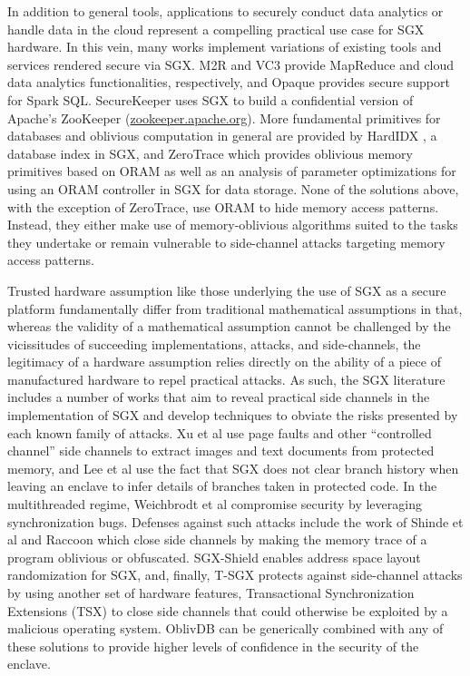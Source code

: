 \documentclass[conference]{IEEEtran}
\def\name/{OblivDB}
\begin{document}
In addition to general tools, applications to securely conduct data analytics or handle data in the cloud represent a compelling practical use case for SGX hardware. In this vein, many works implement variations of existing tools and services rendered secure via SGX. M2R \cite{DSC+15} and VC3 \cite{SCF+15} provide MapReduce and cloud data analytics functionalities, respectively, and Opaque \cite{ZDB+17} provides secure support for Spark SQL. SecureKeeper \cite{BWG+16} uses SGX to build a confidential version of Apache's ZooKeeper (\url{zookeeper.apache.org}). More fundamental primitives for databases and oblivious computation in general are provided by HardIDX \cite{FBB+17}, a database index in SGX, and ZeroTrace \cite{SGF17} which provides oblivious memory primitives based on ORAM as well as an analysis of parameter optimizations for using an ORAM controller in SGX for data storage. None of the solutions above, with the exception of ZeroTrace, use ORAM to hide memory access patterns. Instead, they either make use of memory-oblivious algorithms suited to the tasks they undertake or remain vulnerable to side-channel attacks targeting memory access patterns. 

Trusted hardware assumption like those underlying the use of SGX as a secure platform fundamentally differ from traditional mathematical assumptions in that, whereas the validity of a mathematical assumption cannot be challenged by the vicissitudes of succeeding implementations, attacks, and side-channels, the legitimacy of a hardware assumption relies directly on the ability of a piece of manufactured hardware to repel practical attacks. As such, the SGX literature includes a number of works that aim to reveal practical side channels in the implementation of SGX and develop techniques to obviate the risks presented by each known family of attacks. Xu et al \cite{XCP15} use page faults and other ``controlled channel'' side channels to extract images and text documents from protected memory, and Lee et al \cite{LSG+16} use the fact that SGX does not clear branch history when leaving an enclave to infer details of branches taken in protected code. In the multithreaded regime, Weichbrodt et al \cite{WKPK16} compromise security by leveraging synchronization bugs. Defenses against such attacks include the work of Shinde et al \cite{SCNS16} and Raccoon \cite{RLT15} which close side channels by making the memory trace of a program oblivious or obfuscated. SGX-Shield \cite{SLK+17} enables address space layout randomization for SGX, and, finally, T-SGX \cite{SLKP17} protects against side-channel attacks by using another set of hardware features, Transactional Synchronization Extensions (TSX) to close side channels that could otherwise be exploited by a malicious operating system. \name/ can be generically combined with any of these solutions to provide higher levels of confidence in the security of the enclave. 
\end{document}
